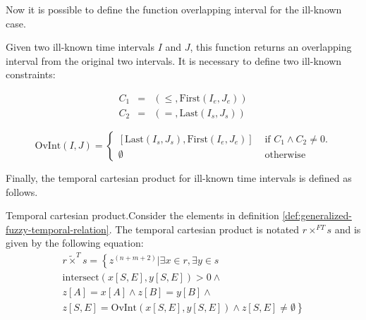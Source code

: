 Now it is possible to define the function overlapping interval for the ill-known case.

\begin{definition}
 \label{def:ik-overlapping-interval}
Given two ill-known time intervals $I$ and $J$, this function returns an overlapping interval from the original two intervals. It is necessary to define two ill-known constraints:

\begin{align}
 \label{eq:ilc-smaller-than}
C_1 &=& \left(\leq,\mbox{First}\left(I_e, J_e \right)\right) \\
C_2 &=& \left(=, \mbox{Last}\left( I_s, J_s \right)\right)
\end{align}



\begin{equation}
 \mbox{OvInt}\left(I, J \right) = 
\begin{cases}
\left[\mbox{Last}\left( I_s, J_s \right), \mbox{First}\left(I_e, J_e \right) \right] & \mbox{ if } C_1 \wedge C_2 \neq 0.  \\
\emptyset & \mbox{ otherwise } 
\end{cases}
\end{equation}
\end{definition}

Finally, the temporal cartesian product for ill-known time intervals is defined as follows.

\begin{definition}
 \label{def:temporal-cartesian-product-ik}Temporal cartesian product.Consider the elements in definition \ref{def:generalized-fuzzy-temporal-relation}.
The temporal cartesian product is notated $r \times^{FT} s$ and is given by the following equation:
\begin{align}
 \label{eq:ik-temporal-cartesian-product}
r \tilde \times^{T} s = \left \lbrace z^{\left(n+m+2\right)}  | \exists x \in r, \exists y \in s \right. \\
\nonumber
\mbox{intersect}\left(x[S, E], y[S, E] \right) > 0 \wedge \\
\nonumber
z\left[A\right] = x\left[A\right] \wedge z\left[B\right] = y \left[B \right] \wedge \\
\nonumber
\left.  z\left[S, E \right] = \mbox{OvInt}\left(x\left[S, E\right], y\left[S, E\right] \right) \wedge z\left[S, E\right] \neq \emptyset  \right \rbrace
\end{align}
\end{definition}

